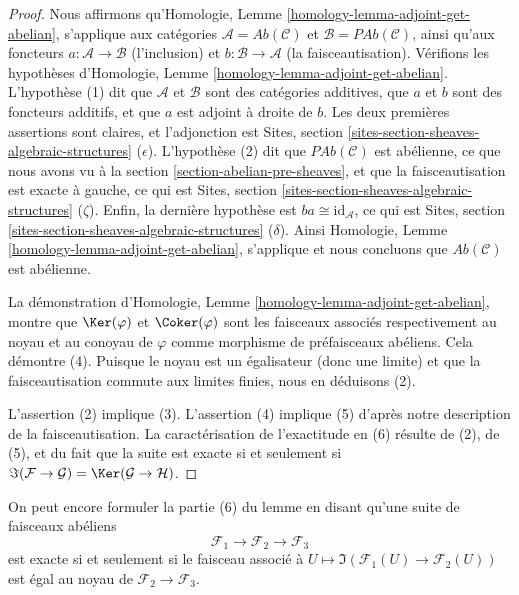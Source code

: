 \begin{proof}
Nous affirmons qu'Homologie, Lemme
\ref{homology-lemma-adjoint-get-abelian}, s'applique aux catégories
$\mathcal{A} = \textit{Ab}(\mathcal{C})$ et
$\mathcal{B} = \textit{PAb}(\mathcal{C})$, ainsi qu'aux foncteurs
$a : \mathcal{A} \to \mathcal{B}$ (l'inclusion) et
$b : \mathcal{B} \to \mathcal{A}$ (la faisceautisation). Vérifions les
hypothèses d'Homologie, Lemme \ref{homology-lemma-adjoint-get-abelian}.
L'hypothèse (1) dit que $\mathcal{A}$ et $\mathcal{B}$ sont des
catégories additives, que $a$ et $b$ sont des foncteurs additifs, et que $a$
est adjoint à droite de $b$. Les deux premières assertions sont claires, et
l'adjonction est Sites, section
\ref{sites-section-sheaves-algebraic-structures} ($\epsilon$). L'hypothèse
(2) dit que $\textit{PAb}(\mathcal{C})$ est abélienne, ce que nous avons vu à
la section \ref{section-abelian-pre-sheaves}, et que la faisceautisation est
exacte à gauche, ce qui est Sites, section
\ref{sites-section-sheaves-algebraic-structures} ($\zeta$). Enfin, la dernière
hypothèse est $ba \cong \text{id}_\mathcal{A}$, ce qui est Sites, section
\ref{sites-section-sheaves-algebraic-structures} ($\delta$). Ainsi Homologie,
Lemme \ref{homology-lemma-adjoint-get-abelian}, s'applique et nous concluons
que $\textit{Ab}(\mathcal{C})$ est abélienne.

\medskip\noindent
La démonstration d'Homologie, Lemme
\ref{homology-lemma-adjoint-get-abelian}, montre que $\Ker(\varphi)$ et
$\Coker(\varphi)$ sont les faisceaux associés respectivement au noyau et au
conoyau de $\varphi$ comme morphisme de préfaisceaux abéliens. Cela démontre
(4). Puisque le noyau est un égalisateur (donc une limite) et que la
faisceautisation commute aux limites finies, nous en déduisons (2).

\medskip\noindent
L'assertion (2) implique (3). L'assertion (4) implique (5) d'après notre
description de la faisceautisation. La caractérisation de l'exactitude en (6)
résulte de (2), de (5), et du fait que la suite est exacte si et seulement si
$\Im(\mathcal{F} \to \mathcal{G}) =
\Ker(\mathcal{G} \to \mathcal{H})$.
\end{proof}

\noindent
On peut encore formuler la partie (6) du lemme en disant qu'une suite de
faisceaux abéliens
$$
\mathcal{F}_1 \longrightarrow
\mathcal{F}_2 \longrightarrow
\mathcal{F}_3
$$
est exacte si et seulement si le faisceau associé à
$U \mapsto \Im(\mathcal{F}_1(U) \to \mathcal{F}_2(U))$
est égal au noyau de $\mathcal{F}_2 \to \mathcal{F}_3$.

